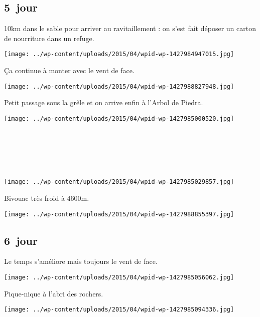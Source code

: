  \subsection*{5\ieme\ jour} 

 10km dans le sable pour arriver au ravitaillement : on s'est fait déposer un carton de nourriture dans un refuge.
\begin{center} \texttt{[image: ../wp-content/uploads/2015/04/wpid-wp-1427984947015.jpg]} \end{center}

 Ça continue à monter avec le vent de face.
\begin{center} \texttt{[image: ../wp-content/uploads/2015/04/wpid-wp-1427988827948.jpg]} \end{center}

  Petit passage sous la grêle et on arrive enfin à l'Arbol de Piedra.
\begin{center} \texttt{[image: ../wp-content/uploads/2015/04/wpid-wp-1427985000520.jpg]} \end{center}
\vspace{-\topsep}

\pagebreak
\subsection*{~}
~
\begin{center} \texttt{[image: ../wp-content/uploads/2015/04/wpid-wp-1427985029857.jpg]} \end{center}

 Bivouac très froid à 4600m.
\begin{center} \texttt{[image: ../wp-content/uploads/2015/04/wpid-wp-1427988855397.jpg]} \end{center}
\vspace{-\topsep}

\pagebreak
 \subsection*{6\ieme\ jour} 
 Le temps s'améliore mais toujours le vent de face.
\begin{center} \texttt{[image: ../wp-content/uploads/2015/04/wpid-wp-1427985056062.jpg]} \end{center}

 Pique-nique à l'abri des rochers.
\begin{center} \texttt{[image: ../wp-content/uploads/2015/04/wpid-wp-1427985094336.jpg]} \end{center}
\vspace{-\topsep}

